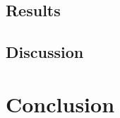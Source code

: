 \documentclass[a4paper,12pt]{article}
\begin{document}
\subsection{Results}

\subsection{Discussion}


\section{Conclusion}
\end{document}

